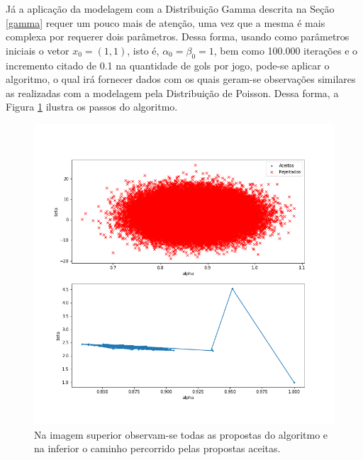 \documentclass[11pt,letterpaper,twocolumn]{article}
\begin{document}
Já a aplicação da modelagem com a Distribuição Gamma descrita na Seção \ref{gamma} requer um pouco mais de atenção, uma vez que a mesma é mais complexa por requerer dois parâmetros. Dessa forma, usando como parâmetros iniciais o vetor $x_0 = (1, 1)$, isto é, $\alpha_0 = \beta_0 = 1$, bem como 100.000 iterações e o incremento citado de 0.1 na quantidade de gols por jogo, pode-se aplicar o algoritmo, o qual irá fornecer dados com os quais geram-se observações similares as realizadas com a modelagem pela Distribuição de Poisson. Dessa forma, a Figura \ref{fig05g} ilustra os passos do algoritmo.
\begin{figure}[hbt]
    \centering
    \includegraphics[scale = 0.40, center]{Gamma/fig05 - gamma.png}
    \caption{Na imagem superior observam-se todas as propostas do algoritmo e na inferior o caminho percorrido pelas propostas aceitas.}
    \label{fig05g}
\end{figure}
\end{document}
